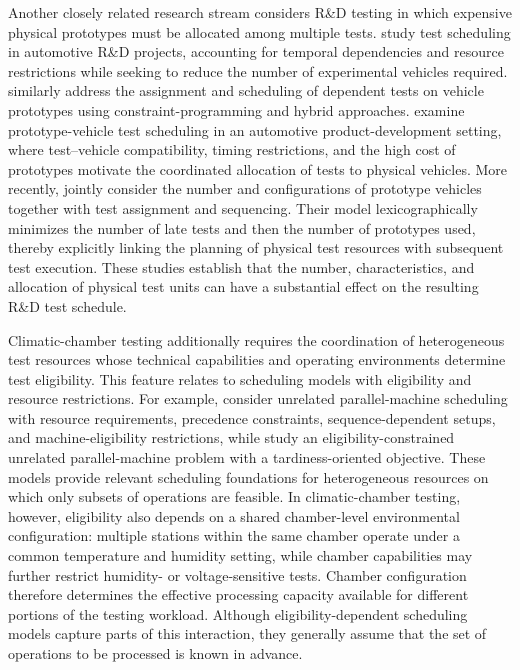 \documentclass[11pt]{article}
\begin{document}
Another closely related research stream considers {R\&D} testing in which
expensive physical prototypes must be allocated among multiple tests.
\citet{BartelsZimmermann2009} study test scheduling in automotive {R\&D}
projects, accounting for temporal dependencies and resource restrictions
while seeking to reduce the number of experimental vehicles required.
\citet{LimtanyakulSchwiegelshohn2012} similarly address the assignment and
scheduling of dependent tests on vehicle prototypes using
constraint-programming and hybrid approaches.
\citet{ShiReichEpelmanKlampflCohn2017} examine prototype-vehicle test
scheduling in an automotive product-development setting, where
test--vehicle compatibility, timing restrictions, and the high cost of
prototypes motivate the coordinated allocation of tests to physical vehicles.
More recently, \citet{ClautiauxEssodaiguiNguyenSadykovYounes2025} jointly
consider the number and configurations of prototype vehicles together with
test assignment and sequencing.
Their model lexicographically minimizes the number of late tests and then
the number of prototypes used, thereby explicitly linking the planning of
physical test resources with subsequent test execution.
These studies establish that the number, characteristics, and allocation of
physical test units can have a substantial effect on the resulting {R\&D}
test schedule.

Climatic-chamber testing additionally requires the coordination of
heterogeneous test resources whose technical capabilities and operating
environments determine test eligibility.
This feature relates to scheduling models with eligibility and resource
restrictions.
For example, \citet{AfzaliradRezaeian2016} consider unrelated
parallel-machine scheduling with resource requirements, precedence
constraints, sequence-dependent setups, and machine-eligibility
restrictions, while \citet{MaeckerShenMonch2023} study an
eligibility-constrained unrelated parallel-machine problem with a
tardiness-oriented objective.
These models provide relevant scheduling foundations for heterogeneous
resources on which only subsets of operations are feasible.
In climatic-chamber testing, however, eligibility also depends on a shared
chamber-level environmental configuration: multiple stations within the same
chamber operate under a common temperature and humidity setting, while
chamber capabilities may further restrict humidity- or voltage-sensitive
tests.
Chamber configuration therefore determines the effective processing capacity
available for different portions of the testing workload.
Although eligibility-dependent scheduling models capture parts of this
interaction, they generally assume that the set of operations to be
processed is known in advance.
\end{document}
